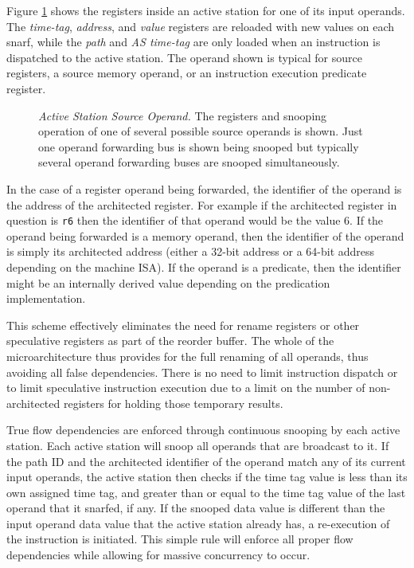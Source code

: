 \documentclass[10pt,dvips]{article}
\begin{document}
Figure \ref{fig:source} shows the registers inside an active
station for one of its input operands.  The 
{\em time-tag},
{\em address}, and
{\em value} registers are reloaded with new values on each snarf,
while the
{\em path} and
{\em AS time-tag} are only loaded when an instruction is
dispatched to the active station.
The operand shown is typical for source registers, a source memory
operand, or an instruction execution predicate register.
%
\begin{figure}
\centering
{}
\caption{{\em Active Station Source Operand.} The registers and snooping
operation of one of several possible source operands is shown.
Just one operand forwarding bus is shown being snooped but
typically several operand forwarding buses are snooped simultaneously.}
\label{fig:source}
\end{figure}
%
In the case of a register operand being forwarded, the identifier of the
operand is the address of the architected register.  For example
if the architected register in question is {\tt r6} then the
identifier of that operand would be the value 6.  If the operand
being forwarded is a memory operand, then the identifier of the operand
is simply its architected address (either a 32-bit address or a 64-bit address
depending on the machine ISA).  If the operand is a predicate,
then the identifier might be an internally derived value depending on
the predication implementation. 

This scheme effectively eliminates the need for rename registers
or other speculative registers as part of the reorder buffer.
The whole of the microarchitecture thus provides for the full renaming
of all operands, thus avoiding all false dependencies.
There is no need to limit instruction dispatch or to limit speculative
instruction execution due to a limit on the number of non-architected
registers for holding those temporary results.

True flow dependencies are enforced through continuous  
snooping by each active station.  Each active station
will snoop all operands that are broadcast to it.  If the
path ID and the architected identifier of the operand match any of
its current input operands, the active station then checks
if the time tag value is less than its own assigned time tag,
and greater than or equal to the time tag value of the last
operand that it snarfed, if any.  If the snooped data value is
different than the input operand data value that the active
station already has, a re-execution of the instruction is initiated.
This simple rule will enforce
all proper flow dependencies while allowing for massive
concurrency to occur.
%
%
\end{document}
